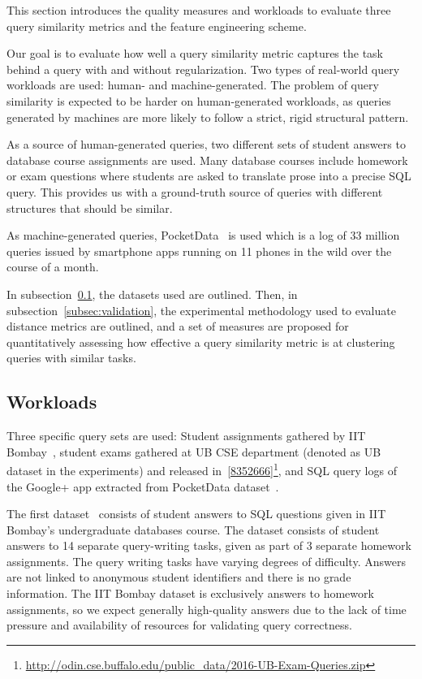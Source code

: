 This section introduces the quality measures and workloads to evaluate three query similarity metrics and the feature engineering scheme.

Our goal is to evaluate how well a query similarity metric captures the task behind a query with and without regularization.
Two types of real-world query workloads are used: human- and machine-generated.  
The problem of query similarity is expected to be harder on human-generated workloads, as queries generated by machines are more likely to follow a strict, rigid structural pattern.

As a source of human-generated queries, two different sets of student answers to database course assignments are used.
Many database courses include homework or exam questions where students are asked to translate prose into a precise SQL query.  
This provides us with a ground-truth source of queries with different structures that should be similar.

As machine-generated queries, PocketData~\cite{pocketdata} is used which is a log of 33 million queries issued by smartphone apps running on 11 phones in the wild over the course of a month.

In subsection~\ref{subsec:data}, the datasets used are outlined.
Then, in subsection~\ref{subsec:validation}, the experimental methodology used to evaluate distance metrics are outlined, and a set of measures are proposed for quantitatively assessing how effective a query similarity metric is at clustering queries with similar tasks.

\subsection{Workloads}
\label{subsec:data}
Three specific query sets are used: Student assignments gathered by IIT Bombay~\cite{chandra2015Data}, student exams gathered at UB CSE department (denoted as UB dataset in the experiments) and released in~\ref{8352666}\footnote{\url{http://odin.cse.buffalo.edu/public_data/2016-UB-Exam-Queries.zip}
}, and SQL query logs of the Google+ app extracted from PocketData dataset~\cite{pocketdata}.

The first dataset~\cite{chandra2015Data} consists of student answers to SQL questions given in IIT Bombay's undergraduate databases course.
The dataset consists of student answers to 14 separate query-writing tasks, given as part of 3 separate homework assignments.
The query writing tasks have varying degrees of difficulty.
Answers are not linked to anonymous student identifiers and there is no grade information.
The IIT Bombay dataset is exclusively answers to homework assignments, so we expect generally high-quality answers due to the lack of time pressure and availability of resources for validating query correctness.

